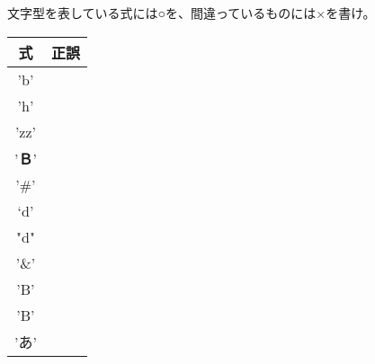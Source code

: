 \documentclass[12pt,a4j]{jarticle}
\newcounter{toi}
\def\toi{%
\bigskip\bigskip\noindent
\addtocounter{toi}{1}
\shadowbox{\bfseries\large 問\thetoi}
\nopagebreak[4]\bigskip\nopagebreak[4]
}
\begin{document}
\toi

\begin{multicols}{2}

 文字型を表している式には○を、間違っているものには×を書け。

 \begin{center}%
 \ttfamily%
 \begin{tabular}{|c|c|} \hline
 式 & 正誤\\ \hline\hline
 'b' & \\ \hline
 'h' & \\ \hline
 'zz' & \\ \hline
 '\mbox{\bfseries Ｂ}' & \\ \hline
 '\#' & \\ \hline
 `d' & \\ \hline
 "d"  & \\ \hline
 '\&' & \\ \hline
 'B' & \\ \hline
 ’B’ & \\ \hline
 'あ' & \\ \hline
 \end{tabular}
 \end{center}

\end{multicols}






\toi
\end{document}
